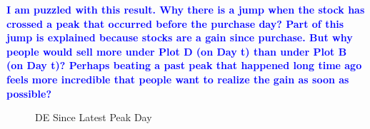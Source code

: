 \textcolor{blue}{\textbf{I am puzzled with this result. Why there is a jump when the stock has crossed a peak that occurred before the purchase day? Part of this jump is explained because stocks are a gain since purchase. But why people would sell more under Plot D (on Day t) than under Plot B (on Day t)? Perhaps beating a past peak that happened long time ago feels more incredible that people want to realize the gain as soon as possible?}}



\begin{figure}%
	\centering%
	\caption{DE Since Latest Peak Day}%
	\label{fig:DE_since_peak_window}%
	\fignote{  }
\end{figure}

